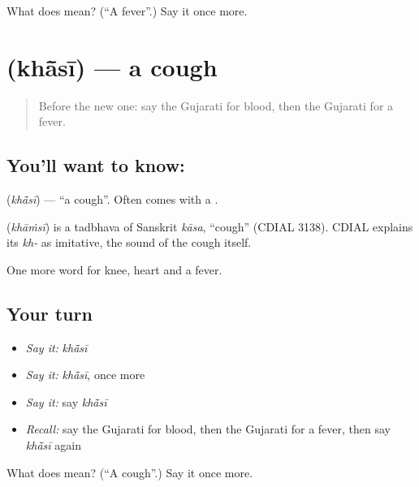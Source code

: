 \begin{tcolorbox}[breakable,colback=teal!4,colframe=teal!35!black,title={Before you move on}]
What does  mean? (\textquotedblleft{}A fever\textquotedblright{}.) Say it once more.
\end{tcolorbox}
\section[\texorpdfstring{\gu{ખાંસી} (khā̃sī)}{ખાંસી (khā̃sī)}]{ (khā̃sī) — a cough}

\label{lesson:GU-C48-cough}



\begin{quote}
Before the new one: say the Gujarati for blood, then the Gujarati for a fever.
\end{quote}

\subsection*{You'll want to know: }
\textbf{} (\emph{khā̃sī}) — \textquotedblleft{}a cough\textquotedblright{}. Often comes with a \textbf{}.

\begin{cousinweb}
\textbf{} (\emph{khāṁsī}) is a tadbhava of Sanskrit \emph{kāsa}, \textquotedblleft{}cough\textquotedblright{} (CDIAL 3138). CDIAL explains its \emph{kh-} as imitative, the sound of the cough itself.
\end{cousinweb}

\begin{grammarlens}[title={What you've built}]
One more word for knee, heart and a fever.
\end{grammarlens}

\subsection*{Your turn}
\begin{itemize}
\raggedright
  \item \emph{Say it:} \emph{khā̃sī}
  \item \emph{Say it:} \emph{khā̃sī}, once more
  \item \emph{Say it:} say \emph{khā̃sī}
  \item \emph{Recall:} say the Gujarati for blood, then the Gujarati for a fever, then say \emph{khā̃sī} again
\end{itemize}

\begin{tcolorbox}[breakable,colback=teal!4,colframe=teal!35!black,title={Before you move on}]
What does  mean? (\textquotedblleft{}A cough\textquotedblright{}.) Say it once more.
\end{tcolorbox}
